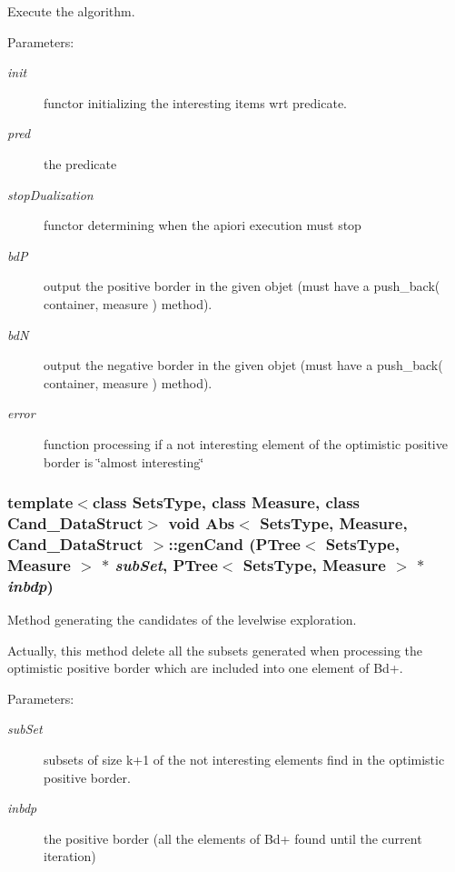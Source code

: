 Execute the algorithm. 

\begin{Desc}
\item[Parameters:]
\begin{description}
\item[{\em init}]functor initializing the interesting items wrt predicate. \item[{\em pred}]the predicate \item[{\em stop\-Dualization}]functor determining when the apiori execution must stop \item[{\em bd\-P}]output the positive border in the given objet (must have a push\_\-back( container, measure ) method). \item[{\em bd\-N}]output the negative border in the given objet (must have a push\_\-back( container, measure ) method). \item[{\em error}]function processing if a not interesting element of the optimistic positive border is \char`\"{}almost interesting\char`\"{} \end{description}
\end{Desc}
\subsubsection{\setlength{\rightskip}{0pt plus 5cm}template$<$class Sets\-Type, class Measure, class Cand\_\-Data\-Struct$>$ void {\bf Abs}$<$ Sets\-Type, Measure, Cand\_\-Data\-Struct $>$::gen\-Cand ({\bf PTree}$<$ Sets\-Type, Measure $>$ $\ast$ {\em sub\-Set}, {\bf PTree}$<$ Sets\-Type, Measure $>$ $\ast$ {\em inbdp})\hspace{0.3cm}{\tt  [protected]}}\label{class_abs_41ebb2a6cc990dee19092f6ca21effa8}


Method generating the candidates of the levelwise exploration. 

Actually, this method delete all the subsets generated when processing the optimistic positive border which are included into one element of Bd+.

\begin{Desc}
\item[Parameters:]
\begin{description}
\item[{\em sub\-Set}]subsets of size k+1 of the not interesting elements find in the optimistic positive border. \item[{\em inbdp}]the positive border (all the elements of Bd+ found until the current iteration) \end{description}
\end{Desc}
